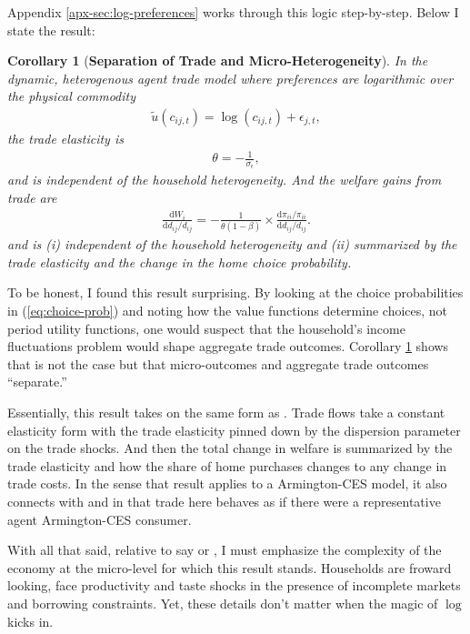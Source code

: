 \documentclass[12pt,pdftex]{article}
\newtheorem{corr}{Corollary}
\begin{document}
\begin{onehalfspacing}
Appendix \ref{apx-sec:log-preferences} works through this logic step-by-step. Below I state the result:
\begin{corr}[\textbf{Separation of Trade and Micro-Heterogeneity}]\label{prp:seperation} In the dynamic, heterogenous agent trade model where preferences are logarithmic over the physical commodity
\begin{align}
\tilde{u}( c_{ij,t} ) =  \log(c_{ij,t}) + \epsilon_{j,t}, \nonumber
\end{align}
the trade elasticity is
\begin{align}
\theta = -\frac{1}{\sigma_{\epsilon}}, \nonumber
\end{align}
and is independent of the household heterogeneity. And the welfare gains from trade are
\begin{align}
\frac{\mathrm{d} W_{i}}{\mathrm{d} d_{ij} / d_{ij}} = -\frac{1}{\theta (1-\beta)} \times \frac{\mathrm{d} \pi_{ii} / \pi_{ii}}{\mathrm{d}d_{ij} / d_{ij}}. \nonumber
\end{align}
and is (i) independent of the household heterogeneity and (ii) summarized by the trade elasticity and the change in the home choice probability.
\end{corr}

To be honest, I found this result surprising. By looking at the choice probabilities in (\ref{eq:choice-prob}) and noting how the value functions determine choices, not period utility functions, one would suspect that the household's income fluctuations problem would shape aggregate trade outcomes. Corollary \ref{prp:seperation} shows that is not the case but that micro-outcomes and aggregate trade outcomes ``separate.''

Essentially, this result takes on the same form as \citet{arkolakis2012new}. Trade flows take a constant elasticity form with the trade elasticity pinned down by the dispersion parameter on the trade shocks. And then the total change in welfare is summarized by the trade elasticity and how the share of home purchases changes to any change in trade costs. In the sense that \citet{arkolakis2012new} result applies to a Armington-CES model, it also connects with \citet{anderson1987ces} and \citet{anderson1992discrete} in that trade here behaves as if there were a representative agent Armington-CES consumer.

With all that said, relative to say \citet{arkolakis2012new} or \citet{anderson1992discrete}, I must emphasize the complexity of the economy at the micro-level for which this result stands. Households are froward looking, face productivity and taste shocks in the presence of incomplete markets and borrowing constraints. Yet, these details don't matter when the magic of $\log$ kicks in.


\end{onehalfspacing}
\end{document}
